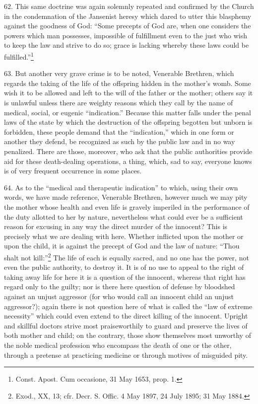 \documentclass[12pt,a4paper]{book}
\begin{document}
62. This same doctrine was again solemnly repeated and confirmed by the Church in the condemnation of the Jansenist heresy which dared to utter this blasphemy against the goodness of God: ``Some precepts of God are, when one considers the powers which man possesses, impossible of fulfillment even to the just who wish to keep the law and strive to do so; grace is lacking whereby these laws could be fulfilled.''\footnote{Const. Apost. Cum occasione, 31 May 1653, prop. 1.}

63. But another very grave crime is to be noted, Venerable Brethren, which regards the taking of the life of the offspring hidden in the mother's womb. Some wish it to be allowed and left to the will of the father or the mother; others say it is unlawful unless there are weighty reasons which they call by the name of medical, social, or eugenic ``indication.'' Because this matter falls under the penal laws of the state by which the destruction of the offspring begotten but unborn is forbidden, these people demand that the ``indication,'' which in one form or another they defend, be recognized as such by the public law and in no way penalized. There are those, moreover, who ask that the public authorities provide aid for these death-dealing operations, a thing, which, sad to say, everyone knows is of very frequent occurrence in some places.

64. As to the ``medical and therapeutic indication'' to which, using their own words, we have made reference, Venerable Brethren, however much we may pity the mother whose health and even life is gravely imperiled in the performance of the duty allotted to her by nature, nevertheless what could ever be a sufficient reason for excusing in any way the direct murder of the innocent? This is precisely what we are dealing with here. Whether inflicted upon the mother or upon the child, it is against the precept of God and the law of nature: ``Thou shalt not kill:''\footnote{Exod., XX, 13; cfr. Decr. S. Offic. 4 May 1897, 24 July 1895; 31 May 1884.} The life of each is equally sacred, and no one has the power, not even the public authority, to destroy it. It is of no use to appeal to the right of taking away life for here it is a question of the innocent, whereas that right has regard only to the guilty; nor is there here question of defense by bloodshed against an unjust aggressor (for who would call an innocent child an unjust aggressor?); again there is not question here of what is called the ``law of extreme necessity'' which could even extend to the direct killing of the innocent. Upright and skillful doctors strive most praiseworthily to guard and preserve the lives of both mother and child; on the contrary, those show themselves most unworthy of the noble medical profession who encompass the death of one or the other, through a pretense at practicing medicine or through motives of misguided pity.
\end{document}
